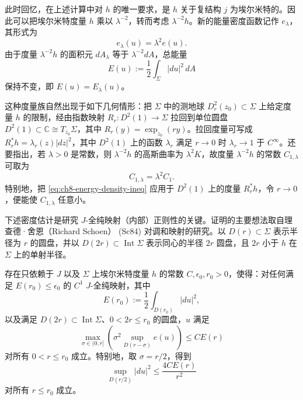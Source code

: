 \begin{remark}\label{rem:ch8-conformal-rescaling-domain-metric}
此时回忆，在上述计算中对 $h$ 的唯一要求，是 $h$ 关于复结构 $j$ 为埃尔米特的。因此可以把埃尔米特度量 $h$ 乘以 $\lambda^{-2}$，转而考虑 $\lambda^{-2}h$。新的能量密度函数记作 $e_\lambda$，其形式为
\[
 e_\lambda(u)=\lambda^2e(u).
\]
由于度量 $\lambda^{-2}h$ 的面积元 $dA_\lambda$ 等于 $\lambda^{-2}dA$，总能量
\[
 E(u):=\frac12\int_\Sigma |du|^2\,dA
\]
保持不变，即 $E(u)=E_\lambda(u)$。

这种度量族自然出现于如下几何情形：把 $\Sigma$ 中的测地球
$D_r^2(z_0)\subset\Sigma$ 上给定度量 $h$ 的限制，经由指数映射
$R_r:D^2(1)\to\Sigma$ 拉回到单位圆盘 $D^2(1)\subset\mathbb C\cong T_{z_0}\Sigma$，其中
$R_r(y)=\exp_{z_0}(ry)$。拉回度量可写成
$R_r^*h=\lambda_r(z)|dz|^2$，其中 $D^2(1)$ 上的函数 $\lambda_r$ 满足
$r\to0$ 时 $\lambda_r\to1$ 于 $C^\infty$。还要指出，若 $\lambda>0$ 是常数，则 $\lambda^{-2}h$ 的高斯曲率为 $\lambda^2K$，故度量 $\lambda^{-2}h$ 的常数 $C_{1,\lambda}$ 可取为
\begin{equation}
 C_{1,\lambda}=\lambda^2C_1.
 \label{eq:ch8-rescaled-curvature-constant}
\end{equation}
特别地，把 \eqref{eq:ch8-energy-density-ineq} 应用于 $D^2(1)$ 上的度量 $R_r^*h$，令 $r\to0$，便能使 $C_{1,\lambda}$ 任意小。
\end{remark}

下述密度估计是研究 $J$-全纯映射（内部）正则性的关键。证明的主要想法取自理查德·舍恩（Richard Schoen） (Sc84) 对调和映射的研究。以 $D(r)\subset\Sigma$ 表示半径为 $r$ 的圆盘，并以 $D(2r)\subset\operatorname{Int}\Sigma$ 表示同心的半径 $2r$ 圆盘，且 $2r$ 小于 $h$ 在 $\Sigma$ 上的单射半径。

\begin{theorem}[内部密度估计]\label{thm:ch8-interior-density-estimate}
存在只依赖于 $J$ 以及 $\Sigma$ 上埃尔米特度量 $h$ 的常数 $C,\epsilon_0,r_0>0$，使得：对任何满足 $E(r_0)\leq\epsilon_0$ 的 $C^1$ $J$-全纯映射，其中
\[
 E(r_0):=\frac12\int_{D(r_0)}|du|^2,
\]
以及满足 $D(2r)\subset\operatorname{Int}\Sigma$、$0<2r\leq r_0$ 的圆盘，$u$ 满足
\begin{equation}
 \max_{\sigma\in(0,r]}\left(\sigma^2\sup_{D(r-\sigma)}e(u)\right)
 \leq CE(r)
 \label{eq:ch8-interior-density-max}
\end{equation}
对所有 $0<r\leq r_0$ 成立。特别地，取 $\sigma=r/2$，得到
\begin{equation}
 \sup_{D(r/2)}|du|^2\leq\frac{4CE(r)}{r^2}
 \label{eq:ch8-interior-density-sup}
\end{equation}
对所有 $r\leq r_0$ 成立。
\end{theorem}

